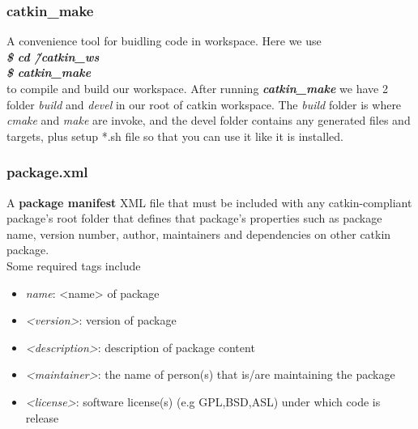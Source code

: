 \documentclass{report}
\begin{document}
\subsubsection{catkin\_make}
A convenience tool for buidling code in workspace. Here we use\\
\textbf{\emph{\$ cd \~/catkin\_ws}}\\
\textbf{\emph{\$ catkin\_make}}\\
to compile and build our workspace. After running \emph{\textbf{catkin\_make}} we have 2 folder \emph{build} and \emph{devel} in our root of catkin workspace. The \emph{build} folder is where \emph{cmake} and \emph{make} are invoke, and the devel folder contains any generated files and targets, plus setup *.sh file so that you can use it like it is installed.

\subsubsection{package.xml}
A \textbf{package manifest} XML file that must be included with any catkin-compliant package's root folder that defines that package's properties such as package name, version number, author, maintainers and dependencies on other catkin package.\\
Some required tags include\\
\begin{itemize}
    \item \textit{name}: <name> of package
    \item \emph{<version>}: version of package
    \item \emph{<description>}: description of package content
    \item \emph{<maintainer>}: the name of person(s) that is/are maintaining the package
    \item \emph{<license>}: software license(s) (e.g GPL,BSD,ASL) under which code is release 
\end{itemize}
\end{document}
